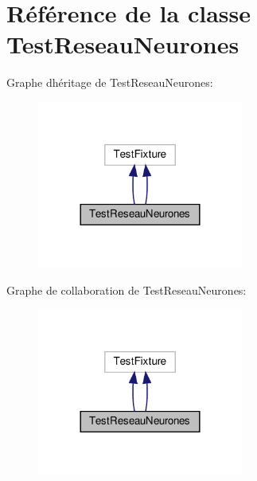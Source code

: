 \hypertarget{class_test_reseau_neurones}{}\section{Référence de la classe Test\+Reseau\+Neurones}
\label{class_test_reseau_neurones}


Graphe d\textquotesingle{}héritage de Test\+Reseau\+Neurones\+:\nopagebreak
\begin{figure}[H]
\begin{center}
\leavevmode
\includegraphics[width=192pt]{class_test_reseau_neurones__inherit__graph}
\end{center}
\end{figure}


Graphe de collaboration de Test\+Reseau\+Neurones\+:\nopagebreak
\begin{figure}[H]
\begin{center}
\leavevmode
\includegraphics[width=192pt]{class_test_reseau_neurones__coll__graph}
\end{center}
\end{figure}
